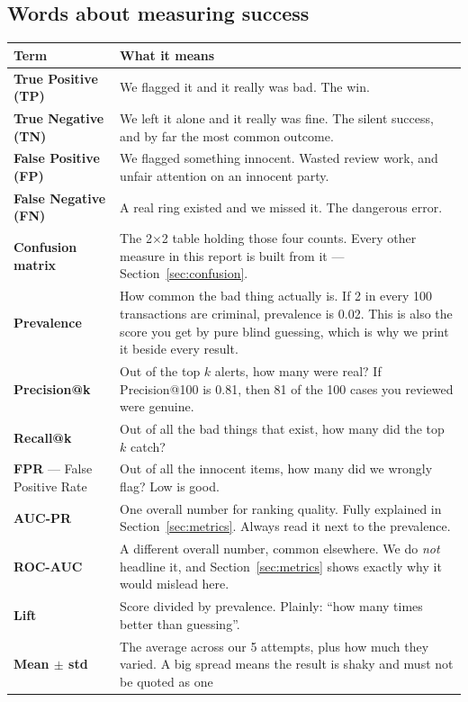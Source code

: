 \documentclass[11pt,a4paper]{article}
\begin{document}
\subsection{Words about measuring success}

\begin{longtable}{@{}p{4.1cm}p{11.4cm}@{}}
\toprule
\textbf{Term} & \textbf{What it means} \\
\midrule
\endhead
\textbf{True Positive (TP)} & We flagged it and it really was bad. The win. \\
\textbf{True Negative (TN)} & We left it alone and it really was fine. The
silent success, and by far the most common outcome. \\
\textbf{False Positive (FP)} & We flagged something innocent. Wasted review
work, and unfair attention on an innocent party. \\
\textbf{False Negative (FN)} & A real ring existed and we missed it. The
dangerous error. \\
\textbf{Confusion matrix} & The 2$\times$2 table holding those four counts.
Every other measure in this report is built from it ---
Section~\ref{sec:confusion}. \\
\textbf{Prevalence} & How common the bad thing actually is. If 2 in every 100
transactions are criminal, prevalence is 0.02. This is also the score you get by
pure blind guessing, which is why we print it beside every result. \\
\textbf{Precision@k} & Out of the top $k$ alerts, how many were real? If
Precision@100 is 0.81, then 81 of the 100 cases you reviewed were genuine. \\
\textbf{Recall@k} & Out of all the bad things that exist, how many did the top $k$
catch? \\
\textbf{FPR} --- False Positive Rate & Out of all the innocent items, how many did
we wrongly flag? Low is good. \\
\textbf{AUC-PR} & One overall number for ranking quality. Fully explained in
Section~\ref{sec:metrics}. Always read it next to the prevalence. \\
\textbf{ROC-AUC} & A different overall number, common elsewhere. We do
\emph{not} headline it, and Section~\ref{sec:metrics} shows exactly why it would
mislead here. \\
\textbf{Lift} & Score divided by prevalence. Plainly: ``how many times better
than guessing''. \\
\textbf{Mean $\pm$ std} & The average across our 5 attempts, plus how much they
varied. A big spread means the result is shaky and must not be quoted as one

\end{longtable}
\end{document}
